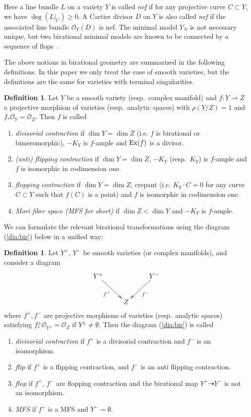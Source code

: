 \documentclass[11pt]{amsart}
\theoremstyle{plain}
\theoremstyle{definition}
\newtheorem{defi}[thm]{Definition}
\theoremstyle{remark}
\newcommand{\oO}{\mathcal{O}}
\newcommand{\Ex}{\mathop{\rm Ex}\nolimits}
\begin{document}
Here a line bundle $L$ on a variety $Y$ is called \textit{nef}
if for any projective curve $C \subset Y$, we have 
$\deg(L|_{C}) \ge 0$. A Cartier divisor 
$D$ on $Y$ is also called \textit{nef} if the associated line bundle 
$\oO_Y(D)$ is nef. 
The minimal model $Y_N$ is not necessary unique, 
but two birational minimal models 
are known to be connected by a sequence of flops~\cite{Kawaflo}. 

The above notions in birational geometry 
are summarized in the 
following definitions. In this paper we only treat the case of smooth 
varieties, but the definitions are the same 
for varieties with terminal singularities. 


\begin{defi}\label{defi:contraction}
Let $Y$ be a smooth variety (resp.~complex manifold)
and 
$f \colon Y \to Z$ a projective morphism
of varieties (resp.~analytic spaces)
with $\rho(Y/Z)=1$
and $f_{\ast}\oO_Y=\oO_Z$.  
Then $f$ is called 
\begin{enumerate}
\item \textit{divisorial contraction} 
if $\dim Y=\dim Z$
(i.e. $f$ is birational or bimeromorphic), 
$-K_Y$ is $f$-ample and 
$\Ex(f)$ is a divisor. 
\item \textit{(anti) flipping contraction} if
$\dim Y=\dim Z$, 
$-K_Y$ (resp.~$K_Y$) is $f$-ample and 
$f$ is isomorphic in codimension one. 
\item \textit{flopping contraction} 
if $\dim Y=\dim Z$, crepant (i.e. 
$K_Y \cdot C=0$ for any curve $C \subset Y$ 
such that $f(C)$ is a point)
and $f$ is isomorphic in codimension one. 
\item \textit{Mori fiber space (MFS for short)} if $\dim Z<\dim Y$
and $-K_Y$ is $f$-ample. 
\end{enumerate}
\end{defi}
We can formulate the relevant 
birational transformations using the diagram (\ref{dia:bir})
below in a unified way: 
\begin{defi}\label{defi:dia}
Let $Y^{+}$, $Y^{-}$ be smooth varieties (or complex manifolds), 
and 
consider a diagram
\begin{align}\label{dia:bir}
\xymatrix{
Y^{+} \ar[rd]_-{f^{+}} &  &  Y^{-} \ar[ld]^-{f^{-}} \\
& Z &
}
\end{align}
where $f^+, f^{-}$ are projective morphisms
of varieties (resp.~analytic spaces)
satisfying $f^{\pm}_{\ast}\oO_{Y^{\pm}}=\oO_Z$
if $Y^{\pm} \neq \emptyset$. 
Then the diagram (\ref{dia:bir}) is called 
\begin{enumerate}
\item \textit{divisorial contraction}
 if $f^{+}$ is a divisorial contraction and 
$f^{-}$ is an isomorphism. 
\item \textit{flip} if $f^{+}$ is a flipping contraction, 
and $f^{-}$ is an anti flipping contraction. 
\item \textit{flop} if $f^{+}$, $f^{-}$ are flopping contraction
and the birational map $Y^{+} \dashrightarrow Y^{-}$ is not an isomorphism. 
\item \textit{MFS} if $f^{+}$ is a MFS and 
$Y^{-}=\emptyset$. 
\end{enumerate}
\end{defi}
\end{document}

